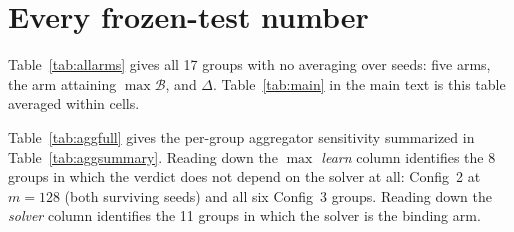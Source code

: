 \section{Every frozen-test number}
\label{app:allarms}

Table~\ref{tab:allarms} gives all 17 groups with no averaging over seeds: five
arms, the arm attaining $\max\mathcal{B}$, and $\Delta$. Table~\ref{tab:main}
in the main text is this table averaged within cells.



Table~\ref{tab:aggfull} gives the per-group aggregator sensitivity summarized in
Table~\ref{tab:aggsummary}. Reading down the \emph{$\max$ learn} column
identifies the 8 groups in which the verdict does not depend on the solver at
all: Config~2 at $m{=}128$ (both surviving seeds) and all six Config~3 groups.
Reading down the \emph{solver} column identifies the 11 groups in which the
solver is the binding arm.


